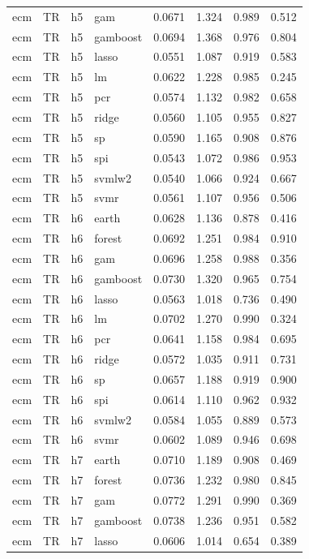 \begin{ThreePartTable}
\begin{longtable}[t]{llclcccc}
ecm & TR & h5 & gam & 0.0671 & 1.324 & 0.989 & 0.512\\
ecm & TR & h5 & gamboost & 0.0694 & 1.368 & 0.976 & 0.804\\
ecm & TR & h5 & lasso & 0.0551 & 1.087 & 0.919 & 0.583\\
ecm & TR & h5 & lm & 0.0622 & 1.228 & 0.985 & 0.245\\
ecm & TR & h5 & pcr & 0.0574 & 1.132 & 0.982 & 0.658\\
ecm & TR & h5 & ridge & 0.0560 & 1.105 & 0.955 & 0.827\\
ecm & TR & h5 & sp & 0.0590 & 1.165 & 0.908 & 0.876\\
ecm & TR & h5 & spi & 0.0543 & 1.072 & 0.986 & 0.953\\
ecm & TR & h5 & svmlw2 & 0.0540 & 1.066 & 0.924 & 0.667\\
ecm & TR & h5 & svmr & 0.0561 & 1.107 & 0.956 & 0.506\\
\addlinespace
ecm & TR & h6 & earth & 0.0628 & 1.136 & 0.878 & 0.416\\
ecm & TR & h6 & forest & 0.0692 & 1.251 & 0.984 & 0.910\\
ecm & TR & h6 & gam & 0.0696 & 1.258 & 0.988 & 0.356\\
ecm & TR & h6 & gamboost & 0.0730 & 1.320 & 0.965 & 0.754\\
ecm & TR & h6 & lasso & 0.0563 & 1.018 & 0.736 & 0.490\\
ecm & TR & h6 & lm & 0.0702 & 1.270 & 0.990 & 0.324\\
ecm & TR & h6 & pcr & 0.0641 & 1.158 & 0.984 & 0.695\\
ecm & TR & h6 & ridge & 0.0572 & 1.035 & 0.911 & 0.731\\
ecm & TR & h6 & sp & 0.0657 & 1.188 & 0.919 & 0.900\\
ecm & TR & h6 & spi & 0.0614 & 1.110 & 0.962 & 0.932\\
ecm & TR & h6 & svmlw2 & 0.0584 & 1.055 & 0.889 & 0.573\\
ecm & TR & h6 & svmr & 0.0602 & 1.089 & 0.946 & 0.698\\
\addlinespace
ecm & TR & h7 & earth & 0.0710 & 1.189 & 0.908 & 0.469\\
ecm & TR & h7 & forest & 0.0736 & 1.232 & 0.980 & 0.845\\
ecm & TR & h7 & gam & 0.0772 & 1.291 & 0.990 & 0.369\\
ecm & TR & h7 & gamboost & 0.0738 & 1.236 & 0.951 & 0.582\\
ecm & TR & h7 & lasso & 0.0606 & 1.014 & 0.654 & 0.389\\

\end{longtable}
\end{ThreePartTable}
